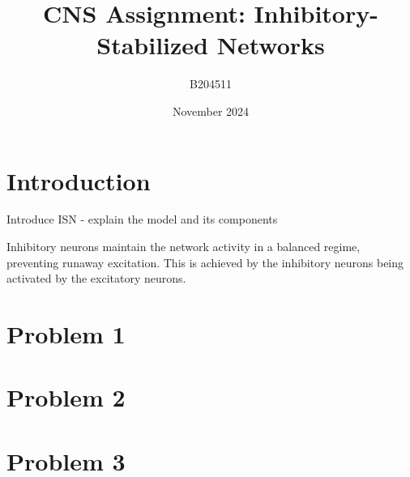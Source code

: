 \documentclass{article}
\begin{document}
\title{CNS Assignment: Inhibitory-Stabilized Networks}
\author{B204511}
\date{November 2024}
\maketitle

\section{Introduction}
Introduce ISN - explain the model and its components

Inhibitory neurons maintain the network activity in a balanced
regime, preventing runaway excitation. This is achieved by the
inhibitory neurons being activated by the excitatory neurons.



\section{Problem 1}

\section{Problem 2}

\section{Problem 3}
\end{document}
